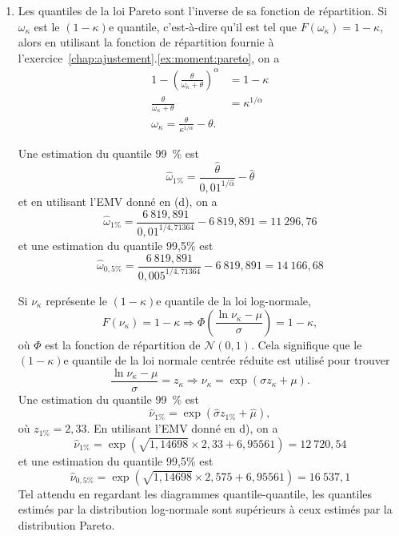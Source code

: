 \begin{exercice}
\begin{sol}
\begin{enumerate}
\item Les quantiles de la loi Pareto sont l'inverse de sa fonction de répartition. Si $\omega_\kappa$ est le $(1-\kappa)$e quantile, c'est-à-dire qu'il est tel que $F(\omega_\kappa)=1-\kappa$, alors en utilisant la fonction de répartition fournie à l'exercice~\ref{chap:ajustement}.\ref{ex:moment:pareto}, on a
\begin{align*}
1-\left(\frac{\theta}{\omega_\kappa+\theta}\right)^\alpha &= 1-\kappa\\
\frac{\theta}{\omega_\kappa+\theta} &= \kappa^{1/\alpha}\\
\omega_\kappa= \frac{\theta}{\kappa^{1/\alpha}}-\theta.
\end{align*}

Une estimation du quantile 99~\% est
$$
\hat\omega_{1\%}= \frac{\hat\theta}{0,01^{1/\hat\alpha}}-\hat\theta
$$
et en utilisant l'EMV donné en (d), on a 
$$
\hat\omega_{1\%}= \frac{6~819,891}{0,01^{1/ 4,71364}}-6~819,891=11~296,76
$$
et une estimation du quantile 99,5\% est
$$
\hat\omega_{0,5\%}= \frac{6~819,891}{0,005^{1/4,71364}}-6~819,891= 14~166,68
$$

Si $\nu_\kappa$ représente le $(1-\kappa)$e quantile de la loi log-normale,
$$
F(\nu_\kappa)=1-\kappa \Rightarrow \Phi\left(\frac{\ln\nu_\kappa-\mu}{\sigma}\right)=1-\kappa,
$$
où $\Phi$ est la fonction de répartition de $\mathcal{N}(0,1)$. Cela signifique que le $(1-\kappa)$e quantile de la loi normale centrée réduite est utilisé pour trouver
$$
\frac{\ln\nu_\kappa-\mu}{\sigma}=z_\kappa \Rightarrow \nu_\kappa = \exp(\sigma z_\kappa+\mu).
$$
Une estimation du quantile 99~\% est
$$
\hat\nu_{1\%}= \exp(\hat\sigma z_{1\%}+\hat\mu),
$$
où $z_{1\%}=2,33$. En utilisant l'EMV donné en d), on a 
$$
\hat\nu_{1\%}= \exp(\sqrt{1,14698}\times 2,33+6,95561)=12~720,54
$$
et une estimation du quantile 99,5\% est
$$
\hat\nu_{0,5\%}= \exp(\sqrt{1,14698}\times 2,575+6,95561)=16~537,1
$$
Tel attendu en regardant les diagrammes quantile-quantile, les quantiles estimés par la distribution log-normale sont supérieurs à ceux estimés par la distribution Pareto.
\end{enumerate}


\end{sol}
\end{exercice}


